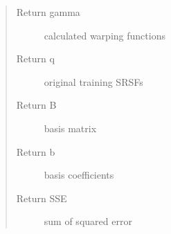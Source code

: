 \documentclass[letterpaper,10pt,english]{sphinxmanual}
\begin{document}
\begin{fulllineitems}
\begin{quote}
\begin{description}
\item[{Return gamma}] \leavevmode
calculated warping functions

\item[{Return q}] \leavevmode
original training SRSFs

\item[{Return B}] \leavevmode
basis matrix

\item[{Return b}] \leavevmode
basis coefficients

\item[{Return SSE}] \leavevmode
sum of squared error

\end{description}\end{quote}

\end{fulllineitems}

\end{document}
